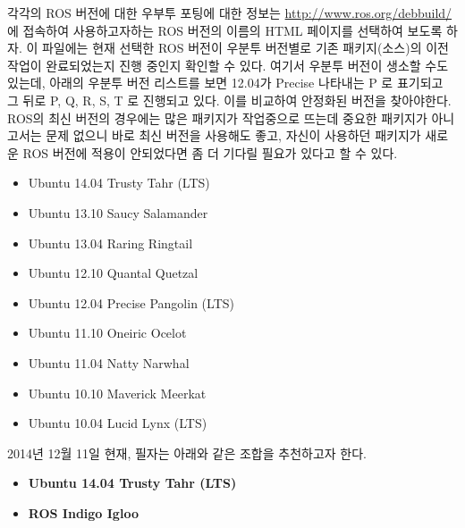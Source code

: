 각각의 ROS 버전에 대한 우부투 포팅에 대한 정보는 \url{http://www.ros.org/debbuild/} 에 접속하여 사용하고자하는 ROS 버전의 이름의 HTML 페이지를 선택하여 보도록 하자. 이 파일에는 현재 선택한 ROS 버전이 우분투 버전별로 기존 패키지(소스)의 이전 작업이 완료되었는지 진행 중인지 확인할 수 있다. 여기서 우분투 버전이 생소할 수도 있는데, 아래의 우분투 버전 리스트를 보면 12.04가 Precise 나타내는 P 로 표기되고 그 뒤로 P, Q, R, S, T 로 진행되고 있다. 이를 비교하여 안정화된 버전을 찾아야한다. ROS의 최신 버전의 경우에는 많은 패키지가 작업중으로 뜨는데 중요한 패키지가 아니고서는 문제 없으니 바로 최신 버전을 사용해도 좋고, 자신이 사용하던 패키지가 새로운 ROS 버전에 적용이 안되었다면 좀 더 기다릴 필요가 있다고 할 수 있다.\\

\begin{itemize}
\item Ubuntu 14.04 Trusty Tahr (LTS)
\item Ubuntu 13.10 Saucy Salamander
\item Ubuntu 13.04 Raring Ringtail 
\item Ubuntu 12.10 Quantal Quetzal 
\item Ubuntu 12.04 Precise Pangolin (LTS)
\item Ubuntu 11.10 Oneiric Ocelot
\item Ubuntu 11.04 Natty Narwhal
\item Ubuntu 10.10 Maverick Meerkat
\item Ubuntu 10.04 Lucid Lynx (LTS)\\
\end{itemize}

2014년 12월 11일 현재, 필자는 아래와 같은 조합을 추천하고자 한다.\\

\begin{itemize}
\item \textbf{Ubuntu 14.04 Trusty Tahr (LTS)}
\item \textbf{ROS Indigo Igloo}
\end{itemize}


